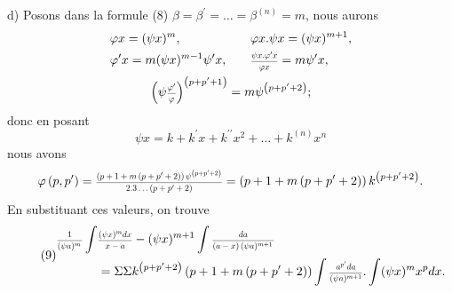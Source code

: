 \documentclass[oneside, 12 pt, leqno]{memoir}
\let\oldfrac\frac
\def\frac#1#2{\mathchoice{\text{\scalebox{.83}{${\oldfrac{#1}{#2}}$}}}{\text{\scalebox{.83}{${\displaystyle\oldfrac{#1}{#2}}$}}}{\genfrac{}{}{}{2}{#1}{#2}}{\genfrac{}{}{}{3}{#1}{#2}}}
\begin{document}
d) Posons dans la formule (8) \(\beta=\beta^{\prime}=\ldots=\beta^{(n)}=m\), nous aurons
\[\begin{gathered}
\begin{aligned}
 &\varphi x=(\psi x)^m, &&\quad  \varphi x. \psi x=(\psi x)^{m+1}, \\
 &\varphi^{\prime} x=m(\psi x)^{m-1} \psi^{\prime} x, &&\quad \frac{\psi x. \varphi^{\prime} x}{\varphi x}=m \psi^{\prime} x,
 \end{aligned} \\
\left(\psi \frac{\varphi^{\prime}}{\varphi}\right)^{\left(p+p^{\prime}+1\right)}=m \psi^{\left(p+p^{\prime}+2\right)}; 
\end{gathered}\]
donc en posant
\[\psi x=k+k^{\prime} x+k^{\prime \prime} x^2+\ldots+k^{(n)} x^n\]
nous avons
\[\varphi\left(p, p^{\prime}\right)=\frac{\left(p+1+m\left(p+p^{\prime}+2\right)\right) \psi^{\left(p+p^{\prime}+2\right)}}{2.3 \ldots\left(p+p^{\prime}+2\right)}=\left(p+1+m\left(p+p^{\prime}+2\right)\right) k^{\left(p+p^{\prime}+2\right)}.\]
En substituant ces valeurs, on trouve
\[\tag{9} \begin{aligned}
 \frac{1}{\left(\psi a)^m\right.} \int &\frac{(\psi x)^m d x}{x-a}-(\psi x)^{m+1} \int \frac{d a}{(a-x)\left(\psi a)^{m+1}\right.} \\
&=\Sigma \Sigma k^{\left(p+p^{\prime}+2\right)}\left(p+1+m\left(p+p^{\prime}+2\right)\right) \int \frac{a^{p^{\prime}} d a}{ (\psi a)^{m+1}}. \int(\psi x)^m x^p d x.
\end{aligned}\]
\end{document}
